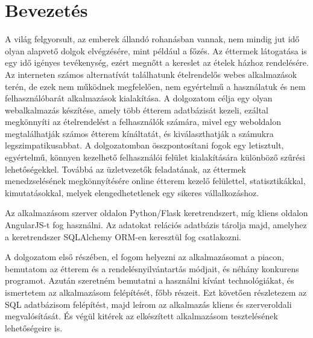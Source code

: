 \chapter{Bevezetés}

A világ felgyorsult, az emberek állandó rohanásban vannak, nem mindig jut idő olyan alapvető dolgok elvégzésére, mint például a főzés. Az éttermek látogatása is egy idő igényes tevékenység, ezért megnőtt a kereslet az ételek házhoz rendelésére. Az interneten számos alternatívát találhatunk ételrendelős webes alkalmazások terén, de ezek nem működnek megfelelően, nem egyértelmű a használatuk és nem felhasználóbarát alkalmazások kialakítása. A dolgozatom célja egy olyan webalkalmazás készítése, amely több étterem adatbázisát kezeli, ezáltal megkönnyíti az ételrendelést a felhasználók számára, mivel egy weboldalon megtalálhatják számos étterem kínáltatát, és kiválaszthatják a számukra legszimpatikusabbat. A dolgozatomban összpontosítani fogok egy letisztult, egyértelmű, könnyen kezelhető felhasználói felület kialakítására különböző szűrési lehetőségekkel. Továbbá az üzletvezetők feladatának, az éttermek menedzselésének megkönnyítésére online étterem kezelő felülettel, statisztikákkal, kimutatásokkal, melyek elengedhetetlenek egy sikeres vállalkozáshoz.

Az alkalmazásom szerver oldalon Python/Flask keretrendszert, míg kliens oldalon AngularJS-t fog használni. Az adatokat relációs adatbázis tárolja majd, amelyhez a keretrendszer SQLAlchemy ORM-en keresztül fog csatlakozni.

A dolgozatom első részében, el fogom helyezni az alkalmazásomat a piacon, bemutatom az étterem és a rendelésnyilvántartás módjait, és néhány konkurens programot. Azután szeretném bemutatni a használni kívánt technológiákat, és ismertetem az alkalmazásom felépítését, főbb részeit. Ezt követően részletezem az SQL adatbázisom felépítést, majd leírom az alkalmazás kliens és szerveroldali megvalósítását. És végül kitérek az elkészített alkalmazásom tesztelésének lehetőségeire is.